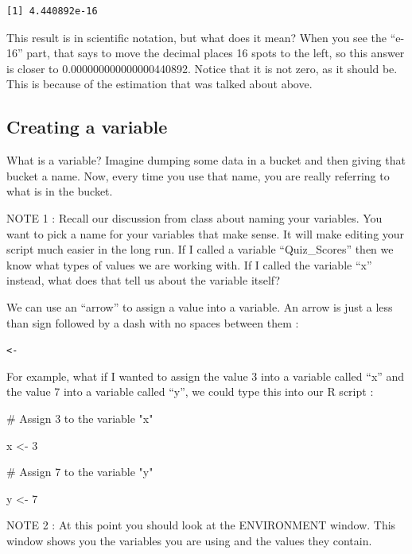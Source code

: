 \documentclass[
  letterpaper,
  DIV=11,
  numbers=noendperiod]{scrreprt}
\newenvironment{Shaded}{\begin{snugshade}}{\end{snugshade}}
\newcommand{\CommentTok}[1]{\textcolor[rgb]{0.37,0.37,0.37}{#1}}
\newcommand{\DecValTok}[1]{\textcolor[rgb]{0.68,0.00,0.00}{#1}}
\newcommand{\NormalTok}[1]{\textcolor[rgb]{0.00,0.23,0.31}{#1}}
\newcommand{\OtherTok}[1]{\textcolor[rgb]{0.00,0.23,0.31}{#1}}
\begin{document}
\begin{verbatim}
[1] 4.440892e-16
\end{verbatim}

This result is in scientific notation, but what does it mean? When you
see the ``e-16'' part, that says to move the decimal places 16 spots to
the left, so this answer is closer to 0.000000000000000440892. Notice
that it is not zero, as it should be. This is because of the estimation
that was talked about above.

\subsection*{Creating a variable}\label{creating-a-variable}

What is a variable? Imagine dumping some data in a bucket and then
giving that bucket a name. Now, every time you use that name, you are
really referring to what is in the bucket.

NOTE 1 : Recall our discussion from class about naming your variables.
You want to pick a name for your variables that make sense. It will make
editing your script much easier in the long run. If I called a variable
``Quiz\_Scores'' then we know what types of values we are working with.
If I called the variable ``x'' instead, what does that tell us about the
variable itself?

We can use an ``arrow'' to assign a value into a variable. An arrow is
just a less than sign followed by a dash with no spaces between them :

\texttt{\textless{}-}

For example, what if I wanted to assign the value 3 into a variable
called ``x'' and the value 7 into a variable called ``y'', we could type
this into our R script :

\begin{Shaded}
\begin{Highlighting}[]
\CommentTok{\# Assign 3 to the variable "x"}

\NormalTok{x }\OtherTok{\textless{}{-}} \DecValTok{3}

\CommentTok{\# Assign 7 to the variable "y"}

\NormalTok{y }\OtherTok{\textless{}{-}} \DecValTok{7}
\end{Highlighting}
\end{Shaded}

NOTE 2 : At this point you should look at the ENVIRONMENT window. This
window shows you the variables you are using and the values they
contain.
\end{document}
